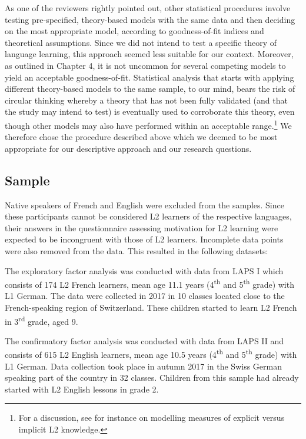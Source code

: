 \documentclass[output=paper]{langsci/langscibook}
\begin{document}
As one of the reviewers rightly pointed out, other statistical procedures involve testing pre-specified, theory-based models with the same data and then deciding on the most appropriate model, according to goodness-of-fit indices and theoretical assumptions. Since we did not intend to test a specific theory of language learning, this approach seemed less suitable for our context. Moreover, as outlined in Chapter 4, it is not uncommon for several competing models to yield an acceptable goodness-of-fit. Statistical analysis that starts with applying different theory-based models to the same sample, to our mind, bears the risk of circular thinking whereby a theory that has not been fully validated (and that the study may intend to test) is eventually used to corroborate this theory, even though other models may also have performed within an acceptable range.\footnote{For a discussion, see for instance \citet{VafaeeEtAl2017} on modelling measures of explicit versus implicit L2 knowledge.} We therefore chose the procedure described above which we deemed to be most appropriate for our descriptive approach and our research questions.

\subsection{Sample}

Native speakers of French and English were excluded from the samples. Since these participants cannot be considered L2 learners of the respective languages, their answers in the questionnaire assessing motivation for L2 learning were expected to be incongruent with those of L2 learners. Incomplete data points were also removed from the data. This resulted in the following datasets:

The exploratory factor analysis was conducted with data from LAPS I which consists of 174 L2 French learners, mean age 11.1 years (4\textsuperscript{th} and 5\textsuperscript{th} grade) with L1 German. The data were collected in 2017 in 10 classes located close to the French-speaking region of Switzerland. These children started to learn L2 French in 3\textsuperscript{rd} grade, aged 9. 

The confirmatory factor analysis was conducted with data from LAPS II and consists of 615 L2 English learners, mean age 10.5 years (4\textsuperscript{th} and 5\textsuperscript{th} grade) with L1 German. Data collection took place in autumn 2017 in the Swiss German speaking part of the country in 32 classes. Children from this sample had already started with L2 English lessons in grade 2. 
\end{document}
